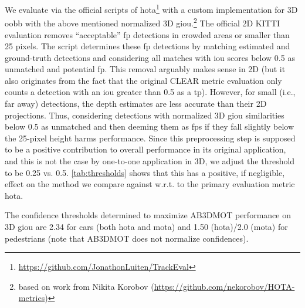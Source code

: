 \documentclass[headsepline, hidelinks, footsepline, footinclude=false, oneside, fontsize=11pt, paper=a4, listof=totoc, bibliography=totoc]{scrbook}
\begin{document}
We evaluate via the official scripts of \gls{hota}\footnote{\url{https://github.com/JonathonLuiten/TrackEval}} with a custom implementation for 3D \gls{oobb} with the above mentioned normalized 3D \gls{giou}.\footnote{based on work from Nikita Korobov (\url{https://github.com/nekorobov/HOTA-metrics})} 
The official 2D KITTI evaluation removes ``acceptable'' \gls{fp} detections in crowded areas or smaller than 25 pixels. The script determines these \gls{fp} detections by matching estimated and ground-truth detections
and considering all matches with \gls{iou} scores below 0.5 as unmatched and potential \gls{fp}.
This removal arguably makes sense in 2D (but it also originates from the fact that the original CLEAR metric evaluation only counts a detection with an \gls{iou} greater than 0.5 as a \gls{tp}). 
However, for small (i.e., far away) detections, the depth estimates are less accurate than their 2D projections. 
Thus, considering detections with normalized 3D \gls{giou} similarities below 0.5 as unmatched and then deeming them as \glspl{fp} if they fall slightly below the 25-pixel height harms performance.
Since this preprocessing step is supposed to be a positive contribution to overall performance in its original application, and this is not the case by one-to-one application in 3D, we adjust the threshold to be 0.25 vs. 0.5. 
\cref{tab:thresholds} shows that this has a positive, if negligible, effect on the method we compare against w.r.t. to the primary evaluation metric \gls{hota}.

The confidence thresholds determined to maximize AB3DMOT performance on 3D \gls{giou} are 2.34 for cars (both \gls{hota} and \gls{mota}) and 1.50 (\gls{hota})/2.0 (\gls{mota}) for pedestrians (note that AB3DMOT does not normalize confidences).
\end{document}
